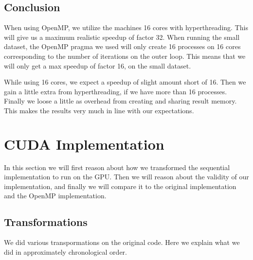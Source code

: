 \documentclass[11pt]{article}
\begin{document}
\begin{table}[h]
\centering
{}
\caption{Speedup comparison of the original implementation and the OpenMP implementation}
\label{table:omptime}
\end{table}

\subsection{Conclusion}
When using OpenMP, we utilize the machines 16 cores with hyperthreading. 
This will give us a maximum realistic speedup of factor 32. When running the small 
dataset, the OpenMP pragma we used will only create 16 processes on 16 cores
corresponding to the number of iterations on the outer loop. This means that 
we will only get a max speedup of factor 16, on the small dataset. 

While using 16 cores, we expect a speedup of slight amount short of 16. Then we 
gain a little extra from hyperthreading, if we have more than 16 processes. 
Finally we loose a little as overhead from creating and sharing result memory.
This makes the results very much in line with our expectations.


\section{CUDA Implementation}
In this section we will first reason about how we transformed the sequential
implementation to run on the GPU. Then we will reason about the validity of 
our implementation, and finally we will compare it to the original 
implementation and the OpenMP implementation.

\subsection{Transformations}
We did various transpormations on the original code. Here we explain what we 
did in approximately chronological order.
\end{document}
